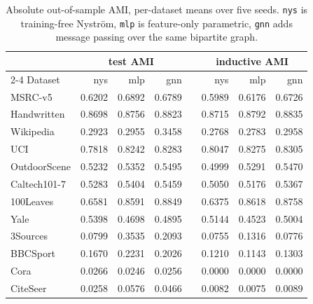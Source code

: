 \documentclass[10pt]{article}
\begin{document}
\begin{table}[h]\centering\footnotesize
\caption{Absolute out-of-sample AMI, per-dataset means over five seeds. \texttt{nys} is
training-free Nystr\"om, \texttt{mlp} is feature-only parametric, \texttt{gnn} adds message
passing over the same bipartite graph.}
\begin{tabular}{@{}l rrr c rrr@{}}
\toprule
& \multicolumn{3}{c}{test AMI} & & \multicolumn{3}{c}{inductive AMI}\\
\cmidrule{2-4}\cmidrule{6-8}
Dataset & nys & mlp & gnn & & nys & mlp & gnn\\
\midrule
MSRC-v5      & 0.6202 & 0.6892 & 0.6789 & & 0.5989 & 0.6176 & 0.6726\\
Handwritten  & 0.8698 & 0.8756 & 0.8823 & & 0.8715 & 0.8792 & 0.8835\\
Wikipedia    & 0.2923 & 0.2955 & 0.3458 & & 0.2768 & 0.2783 & 0.2958\\
UCI          & 0.7818 & 0.8242 & 0.8283 & & 0.8047 & 0.8275 & 0.8305\\
OutdoorScene & 0.5232 & 0.5352 & 0.5495 & & 0.4999 & 0.5291 & 0.5470\\
Caltech101-7 & 0.5283 & 0.5404 & 0.5459 & & 0.5050 & 0.5176 & 0.5367\\
100Leaves    & 0.6581 & 0.8591 & 0.8849 & & 0.6375 & 0.8618 & 0.8758\\
Yale         & 0.5398 & 0.4698 & 0.4895 & & 0.5144 & 0.4523 & 0.5004\\
3Sources     & 0.0799 & 0.3535 & 0.2093 & & 0.0755 & 0.1316 & 0.0776\\
BBCSport     & 0.1670 & 0.2231 & 0.2026 & & 0.1210 & 0.1143 & 0.1303\\
Cora         & 0.0266 & 0.0246 & 0.0256 & & 0.0000 & 0.0000 & 0.0000\\
CiteSeer     & 0.0258 & 0.0576 & 0.0466 & & 0.0082 & 0.0075 & 0.0089\\
\bottomrule
\end{tabular}
\end{table}
\end{document}
